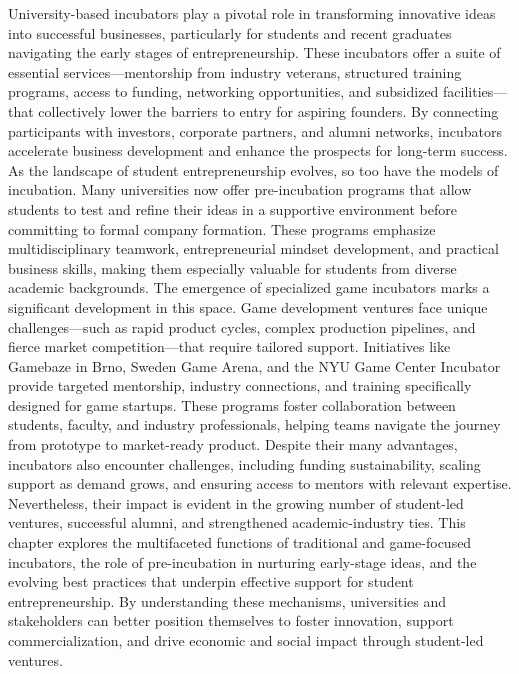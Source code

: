 University-based incubators play a pivotal role in transforming innovative ideas into successful businesses, particularly for students and recent graduates navigating the early stages of entrepreneurship. These incubators offer a suite of essential services—mentorship from industry veterans, structured training programs, access to funding, networking opportunities, and subsidized facilities—that collectively lower the barriers to entry for aspiring founders. By connecting participants with investors, corporate partners, and alumni networks, incubators accelerate business development and enhance the prospects for long-term success.
As the landscape of student entrepreneurship evolves, so too have the models of incubation. Many universities now offer pre-incubation programs that allow students to test and refine their ideas in a supportive environment before committing to formal company formation. These programs emphasize multidisciplinary teamwork, entrepreneurial mindset development, and practical business skills, making them especially valuable for students from diverse academic backgrounds.
The emergence of specialized game incubators marks a significant development in this space. Game development ventures face unique challenges—such as rapid product cycles, complex production pipelines, and fierce market competition—that require tailored support. Initiatives like Gamebaze in Brno, Sweden Game Arena, and the NYU Game Center Incubator provide targeted mentorship, industry connections, and training specifically designed for game startups. These programs foster collaboration between students, faculty, and industry professionals, helping teams navigate the journey from prototype to market-ready product.
Despite their many advantages, incubators also encounter challenges, including funding sustainability, scaling support as demand grows, and ensuring access to mentors with relevant expertise. Nevertheless, their impact is evident in the growing number of student-led ventures, successful alumni, and strengthened academic-industry ties.
This chapter explores the multifaceted functions of traditional and game-focused incubators, the role of pre-incubation in nurturing early-stage ideas, and the evolving best practices that underpin effective support for student entrepreneurship. By understanding these mechanisms, universities and stakeholders can better position themselves to foster innovation, support commercialization, and drive economic and social impact through student-led ventures.

